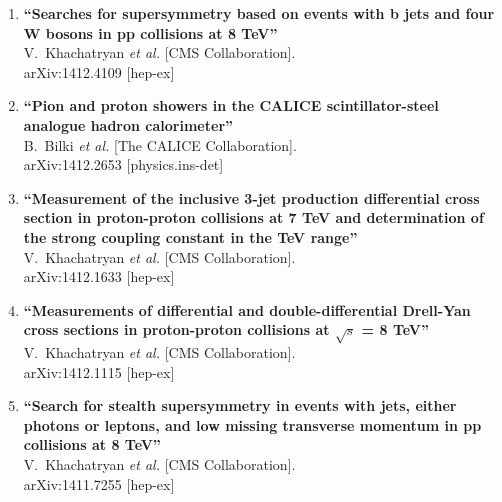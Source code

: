 \documentclass{article}
\begin{document}
\begin{enumerate}


\item%
{\bf ``Searches for supersymmetry based on events with b jets and four W bosons in pp collisions at 8 TeV''}
  \\{}V.~Khachatryan {\it et al.}  [CMS Collaboration].
  \\{}arXiv:1412.4109 [hep-ex]
  


\item%
{\bf ``Pion and proton showers in the CALICE scintillator-steel analogue hadron calorimeter''}
  \\{}B.~Bilki {\it et al.}  [The CALICE Collaboration].
  \\{}arXiv:1412.2653 [physics.ins-det]
  



\item%
{\bf ``Measurement of the inclusive 3-jet production differential cross section in proton-proton collisions at 7 TeV and determination of the strong coupling constant in the TeV range''}
  \\{}V.~Khachatryan {\it et al.}  [CMS Collaboration].
  \\{}arXiv:1412.1633 [hep-ex]
  


\item%
{\bf ``Measurements of differential and double-differential Drell-Yan cross sections in proton-proton collisions at $\sqrt{s}$ = 8 TeV''}
  \\{}V.~Khachatryan {\it et al.}  [CMS Collaboration].
  \\{}arXiv:1412.1115 [hep-ex]
  



\item%
{\bf ``Search for stealth supersymmetry in events with jets, either photons or leptons, and low missing transverse momentum in pp collisions at 8 TeV''}
  \\{}V.~Khachatryan {\it et al.}  [CMS Collaboration].
  \\{}arXiv:1411.7255 [hep-ex]
  

\end{enumerate}
\end{document}
